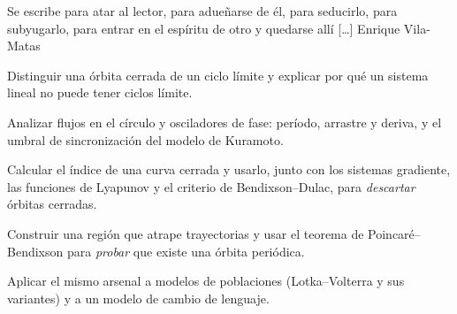 
  {Se escribe para atar al lector, para adueñarse de él, para seducirlo, para subyugarlo, para entrar en el espíritu de otro y quedarse allí [\dots]}
  {Enrique Vila-Matas}

\begin{objetivos}
  \item Distinguir una órbita cerrada de un ciclo límite y explicar por qué un sistema lineal no puede tener ciclos límite.
  \item Analizar flujos en el círculo y osciladores de fase: período, arrastre y deriva, y el umbral de sincronización del modelo de Kuramoto.
  \item Calcular el índice de una curva cerrada y usarlo, junto con los sistemas gradiente, las funciones de Lyapunov y el criterio de Bendixson--Dulac, para \emph{descartar} órbitas cerradas.
  \item Construir una región que atrape trayectorias y usar el teorema de Poincaré--Bendixson para \emph{probar} que existe una órbita periódica.
  \item Aplicar el mismo arsenal a modelos de poblaciones (Lotka--Volterra y sus variantes) y a un modelo de cambio de lenguaje.
\end{objetivos}













